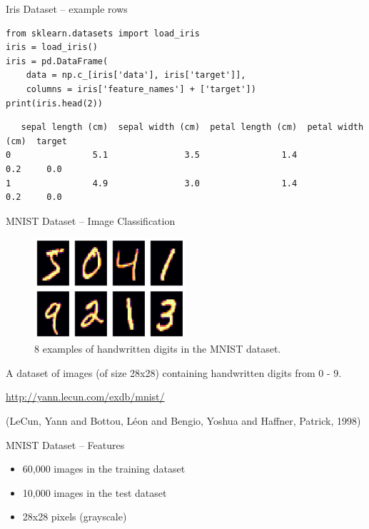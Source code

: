 \documentclass[10pt]{beamer}
\begin{document}
\begin{frame}[label={sec:orgecdd829},fragile]{Iris Dataset -- example rows}
 \begin{verbatim}
from sklearn.datasets import load_iris
iris = load_iris()
iris = pd.DataFrame(
    data = np.c_[iris['data'], iris['target']],
    columns = iris['feature_names'] + ['target'])
print(iris.head(2))
\end{verbatim}

\begin{verbatim}
   sepal length (cm)  sepal width (cm)  petal length (cm)  petal width (cm)  target
0                5.1               3.5                1.4               0.2     0.0
1                4.9               3.0                1.4               0.2     0.0
\end{verbatim}
\end{frame}

\begin{frame}[label={sec:org98a2ebc}]{MNIST Dataset -- Image Classification}
\begin{figure}[htbp]
\centering
\includegraphics[width=0.5\textwidth]{images/mnist.png}
\caption{8 examples of handwritten digits in the MNIST dataset.}
\end{figure}

A dataset of images (of size 28x28) containing handwritten digits from 0 - 9.

\url{http://yann.lecun.com/exdb/mnist/}

(LeCun, Yann and Bottou, L{\'e}on and Bengio, Yoshua and Haffner, Patrick, 1998)
\end{frame}

\begin{frame}[label={sec:orgc57d7ae}]{MNIST Dataset -- Features}
\begin{itemize}
\item 60,000 images in the training dataset
\item 10,000 images in the test dataset
\item 28x28 pixels (grayscale)
\end{itemize}
\end{frame}
\end{document}
